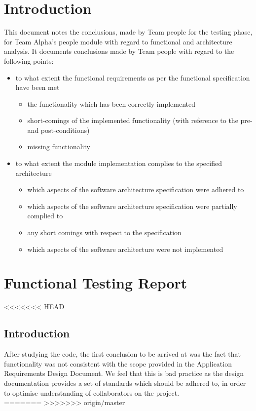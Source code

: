 \documentclass{article}
\begin{document}
 
\tableofcontents
\thispagestyle{empty}
\cleardoublepage


\setcounter{page}{1}
\section{Introduction}
This document notes the conclusions, made by Team people for the testing phase, for Team Alpha's people module with regard to functional and architecture analysis. It documents conclusions made by Team people with regard to the following points:

\begin{itemize}
    \item to what extent the functional requirements as per the functional specification have been met
        \begin{itemize}
            \item the functionality which has been correctly implemented
            \item short-comings of the implemented functionality (with     reference to the pre- and post-conditions)
            \item missing functionality
        \end{itemize}
        
    \item to what extent the module implementation complies to the specified architecture
        \begin{itemize}
            \item which aspects of the software architecture specification were adhered to
            \item which aspects of the software architecture specification were partially complied to 
            \item any short comings with respect to the specification
            \item which aspects of the software architecture were not implemented
        \end{itemize}
\end{itemize}

\section{Functional Testing Report}
<<<<<<< HEAD
	\subsection{Introduction}
	After studying the code, the first conclusion to be arrived at was the fact that functionality was not consistent with the scope provided in the Application Requirements Design Document. We feel that this is bad practice as the design documentation provides a set of standards which should be adhered to, in order to optimise understanding of collaborators on the project.\\
=======
>>>>>>> origin/master
\end{document}
